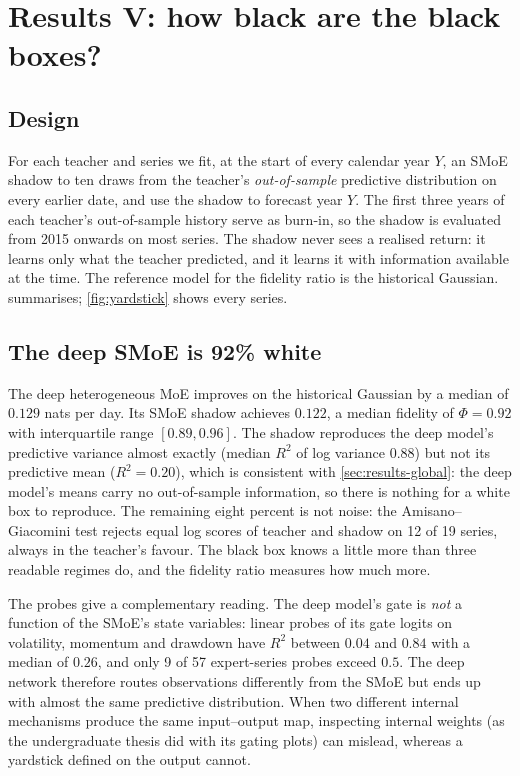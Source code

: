 \section{Results V: how black are the black boxes?}\label{sec:yardstick}

\subsection{Design}
For each teacher and series we fit, at the start of every calendar year $Y$, an SMoE shadow to ten
draws from the teacher's \emph{out-of-sample} predictive distribution on every earlier date, and use
the shadow to forecast year $Y$. The first three years of each teacher's out-of-sample history serve
as burn-in, so the shadow is evaluated from 2015 onwards on most series. The shadow never sees a
realised return: it learns only what the teacher predicted, and it learns it with information
available at the time. The reference model for the fidelity ratio is the historical Gaussian.
 summarises; \cref{fig:yardstick} shows every series.

\subsection{The deep SMoE is 92\% white}
The deep heterogeneous MoE improves on the historical Gaussian by a median of $0.129$ nats per day.
Its SMoE shadow achieves $0.122$, a median fidelity of $\Phi=0.92$ with interquartile range
$[0.89,0.96]$. The shadow reproduces the deep model's predictive variance almost exactly (median
$R^2$ of log variance $0.88$) but not its predictive mean ($R^2=0.20$), which is consistent with
\cref{sec:results-global}: the deep model's means carry no out-of-sample information, so there is
nothing for a white box to reproduce. The remaining eight percent is not noise: the
Amisano--Giacomini test rejects equal log scores of teacher and shadow on 12 of 19 series, always in
the teacher's favour. The black box knows a little more than three readable regimes do, and the
fidelity ratio measures how much more.

The probes give a complementary reading. The deep model's gate is \emph{not} a function of the
SMoE's state variables: linear probes of its gate logits on volatility, momentum and drawdown have
$R^2$ between $0.04$ and $0.84$ with a median of $0.26$, and only 9 of 57 expert-series probes exceed
$0.5$. The deep network therefore routes observations differently from the SMoE but ends up with
almost the same predictive distribution. When two different internal mechanisms produce the same
input--output map, inspecting internal weights (as the undergraduate thesis did with its gating
plots) can mislead, whereas a yardstick defined on the output cannot.


